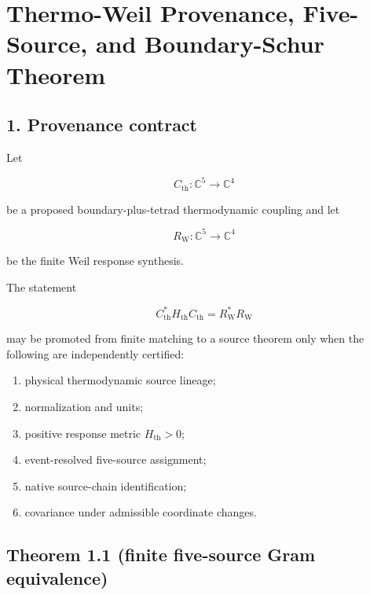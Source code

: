 \hypertarget{thermo-weil-provenance-five-source-and-boundary-schur-theorem}{%
\chapter{Thermo-Weil Provenance, Five-Source, and Boundary-Schur Theorem}\label{thermo-weil-provenance-five-source-and-boundary-schur-theorem}}

\hypertarget{provenance-contract}{%
\section{1. Provenance contract}\label{provenance-contract}}

Let

\[
C_{\mathrm{th}}:\mathbb C^5\to\mathbb C^4
\]

be a proposed boundary-plus-tetrad thermodynamic coupling and let

\[
R_{\mathrm W}:\mathbb C^5\to\mathbb C^4
\]

be the finite Weil response synthesis.

The statement

\[
C_{\mathrm{th}}^*H_{\mathrm{th}}C_{\mathrm{th}}
=R_{\mathrm W}^*R_{\mathrm W}
\]

may be promoted from finite matching to a source theorem only when the following are independently certified:

\begin{enumerate}
\def\labelenumi{\arabic{enumi}.}
\tightlist
\item
  physical thermodynamic source lineage;
\item
  normalization and units;
\item
  positive response metric \(H_{\mathrm{th}}>0\);
\item
  event-resolved five-source assignment;
\item
  native source-chain identification;
\item
  covariance under admissible coordinate changes.
\end{enumerate}

\hypertarget{theorem-1.1-finite-five-source-gram-equivalence}{%
\section{Theorem 1.1 (finite five-source Gram equivalence)}\label{theorem-1.1-finite-five-source-gram-equivalence}}

